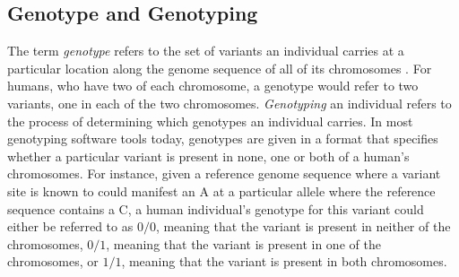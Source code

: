 \subsection{Genotype and Genotyping} \label{background:genotype_and_genotyping}
The term \textit{genotype} refers to the set of variants an individual carries at a particular location along the genome sequence of all of its chromosomes \cite{nhgri_genotype}.
For humans, who have two of each chromosome, a genotype would refer to two variants, one in each of the two chromosomes.
\textit{Genotyping} an individual refers to the process of determining which genotypes an individual carries. 
In most genotyping software tools today, genotypes are given in a format that specifies whether a particular variant is present in none, one or both of a human's chromosomes.
For instance, given a reference genome sequence where a variant site is known to could manifest an A at a particular allele where the reference sequence contains a C, a human individual's genotype for this variant could either be referred to as $0/0$, meaning that the variant is present in neither of the chromosomes, $0/1$, meaning that the variant is present in one of the chromosomes, or $1/1$, meaning that the variant is present in both chromosomes.


